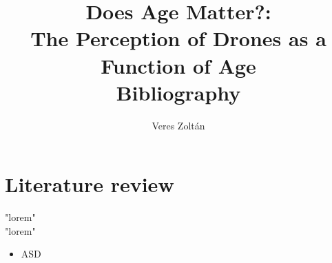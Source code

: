 \documentclass{article}
\title{Does Age Matter?: \\ The Perception of Drones as a Function of Age \\ Bibliography}
\author{Veres Zoltán}
\begin{document}
\maketitle

\section{Literature review}
"lorem" \cite{Tan2021} \\
"lorem" \cite{Tan2022}
\begin{itemize}
	\item ASD
\end{itemize}

%
%
\printbibliography
\end{document}
